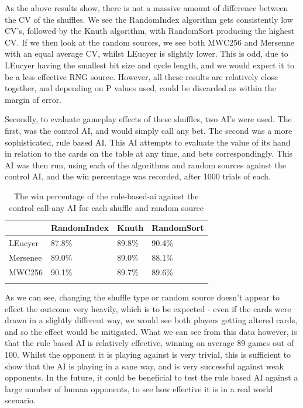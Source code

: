As the above results show, there is not a massive amount of difference between
the CV of the shuffles. We see the RandomIndex algorithm gets consistently low
CV's, followed by the Knuth algorithm, with RandomSort producing the highest
CV. If we then look at the random sources, we see both MWC256 and Mersenne
with an equal average CV, whilst LEucyer is slightly lower. This is odd, due
to LEucyer having the smallest bit size and cycle length, and we would expect
it to be a less effective RNG source. However, all these results are relatively
close together, and depending on P values used, could be discarded as within
the margin of error.

Secondly, to evaluate gameplay effects of these shuffles, two AI's were used.
The first, was the control AI, and would simply call any bet. The second
was a more sophisticated, rule based AI\@. This AI attempts to evaluate the value
of its hand in relation to the cards on the table at any time, and bets
correspondingly. This AI was then run, using each of the algorithms and
random sources against the control AI, and the win percentage was recorded,
after 1000 trials of each.

\begin{table}[H]
    \centering
    \begin{tabular}{l l l l}
    \toprule
                & RandomIndex   & Knuth & RandomSort  \\
    \midrule
    LEucyer     & 87.8\%        & 89.8\%& 90.4\%      \\ \addlinespace
    Mersenee    & 89.0\%        & 89.0\%& 88.1\%      \\ \addlinespace
    MWC256      & 90.1\%        & 89.7\%& 89.6\%      \\ \addlinespace
    \bottomrule
    \end{tabular}
    \caption{The win percentage of the rule-based-ai against the control
             call-any AI for each shuffle and random source}
\end{table}

As we can see, changing the shuffle type or random source doesn't appear to
effect the outcome very heavily, which is to be expected - even if the cards
were drawn in a slightly different way, we would see both players getting
altered cards, and so the effect would be mitigated. What we can see from this
data however, is that the rule based AI is relatively effective, winning on
average 89 games out of 100. Whilst the opponent it is playing against is very
trivial, this is sufficient to show that the AI is playing in a sane way, and
is very successful against weak opponents. In the future, it could be beneficial
to test the rule based AI against a large number of human opponents, to see
how effective it is in a real world scenario.

